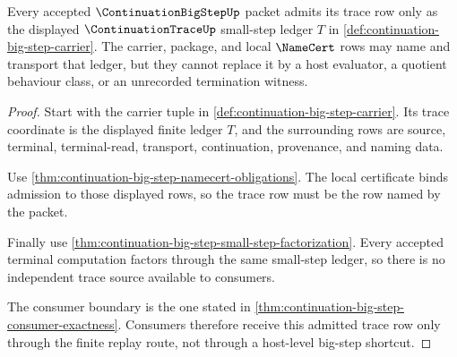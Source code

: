 \begin{theorem}
\label{thm:continuation-bigstep-trace-row-admission}
Every accepted $\ContinuationBigStepUp$ packet admits its trace row only as
the displayed $\ContinuationTraceUp$ small-step ledger $T$ in
\autoref{def:continuation-big-step-carrier}. The carrier, package, and local
$\NameCert$ rows may name and transport that ledger, but they cannot replace
it by a host evaluator, a quotient behaviour class, or an unrecorded
termination witness.
\end{theorem}
\begin{proof}
Start with the carrier tuple in
\autoref{def:continuation-big-step-carrier}. Its trace coordinate is the
displayed finite ledger $T$, and the surrounding rows are source, terminal,
terminal-read, transport, continuation, provenance, and naming data.

Use \autoref{thm:continuation-big-step-namecert-obligations}. The local
certificate binds admission to those displayed rows, so the trace row must be
the row named by the packet.

Finally use
\autoref{thm:continuation-big-step-small-step-factorization}. Every accepted
terminal computation factors through the same small-step ledger, so there is
no independent trace source available to consumers.

The consumer boundary is the one stated in
\autoref{thm:continuation-big-step-consumer-exactness}. Consumers therefore
receive this admitted trace row only through the finite replay route, not
through a host-level big-step shortcut.
\end{proof}

